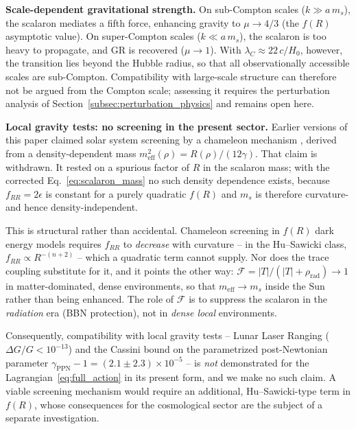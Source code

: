\documentclass[aps,prd,twocolumn,superscriptaddress,nofootinbib]{revtex4-2}
\begin{document}
\textbf{Scale-dependent gravitational strength.} On sub-Compton scales ($k \gg a\,m_s$), the scalaron mediates a fifth force, enhancing gravity to $\mu \to 4/3$ (the $f(R)$ asymptotic value). On super-Compton scales ($k \ll a\,m_s$), the scalaron is too heavy to propagate, and GR is recovered ($\mu \to 1$). With $\lambda_C \approx 22\,c/H_0$, however, the transition lies beyond the Hubble radius, so that all observationally accessible scales are sub-Compton. Compatibility with large-scale structure can therefore not be argued from the Compton scale; assessing it requires the perturbation analysis of Section~\ref{subsec:perturbation_physics} and remains open here.

\textbf{Local gravity tests: no screening in the present sector.} Earlier versions of this paper claimed solar system screening by a chameleon mechanism \cite{Khoury2004}, derived from a density-dependent mass $m_{\mathrm{eff}}^2(\rho) = R(\rho)/(12\gamma)$. That claim is withdrawn. It rested on a spurious factor of $R$ in the scalaron mass; with the corrected Eq.~\eqref{eq:scalaron_mass} no such density dependence exists, because $f_{RR} = 2\epsilon$ is constant for a purely quadratic $f(R)$ and $m_s$ is therefore curvature- and hence density-independent.

This is structural rather than accidental. Chameleon screening in $f(R)$ dark energy models requires $f_{RR}$ to \textit{decrease} with curvature -- in the Hu--Sawicki class, $f_{RR} \propto R^{-(n+2)}$ \cite{HuSawicki2007} -- which a quadratic term cannot supply. Nor does the trace coupling substitute for it, and it points the other way: $\mathcal{F} = |T|/(|T| + \rho_{\mathrm{rad}}) \to 1$ in matter-dominated, dense environments, so that $m_{\mathrm{eff}} \to m_s$ inside the Sun rather than being enhanced. The role of $\mathcal{F}$ is to suppress the scalaron in the \textit{radiation} era (BBN protection), not in \textit{dense local} environments.

Consequently, compatibility with local gravity tests -- Lunar Laser Ranging ($\Delta G/G < 10^{-13}$) \cite{Williams2004} and the Cassini bound on the parametrized post-Newtonian parameter $\gamma_{\mathrm{PPN}} - 1 = (2.1 \pm 2.3) \times 10^{-5}$ \cite{Bertotti2003} -- is \textit{not} demonstrated for the Lagrangian~\eqref{eq:full_action} in its present form, and we make no such claim. A viable screening mechanism would require an additional, Hu--Sawicki-type term in $f(R)$, whose consequences for the cosmological sector are the subject of a separate investigation.
\end{document}
